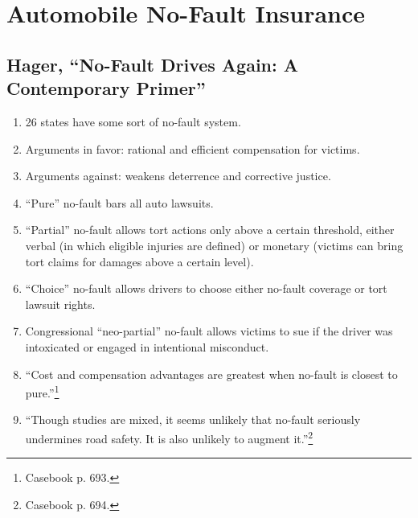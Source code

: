 \section{Automobile No-Fault Insurance}

\subsection{Hager, ``No-Fault Drives Again: A Contemporary Primer''}

\begin{enumerate}
    \item 26 states have some sort of no-fault system.
    \item Arguments in favor: rational and efficient compensation for victims.
    \item Arguments against: weakens deterrence and corrective justice.
    \item ``Pure'' no-fault bars all auto lawsuits.
    \item ``Partial'' no-fault allows tort actions only above a certain 
    threshold, either verbal (in which eligible injuries are defined) or 
    monetary (victims can bring tort claims for damages above a certain 
    level).
    \item ``Choice'' no-fault allows drivers to choose either no-fault coverage 
    or tort lawsuit rights.
    \item Congressional ``neo-partial'' no-fault allows victims to sue if the 
    driver was intoxicated or engaged in intentional misconduct.
    \item ``Cost and compensation advantages are greatest when no-fault is 
    closest to pure.''\footnote{Casebook p. 693.}
    \item ``Though studies are mixed, it seems unlikely that no-fault 
    seriously undermines road safety. It is also unlikely to augment 
    it.''\footnote{Casebook p. 694.}
\end{enumerate}

